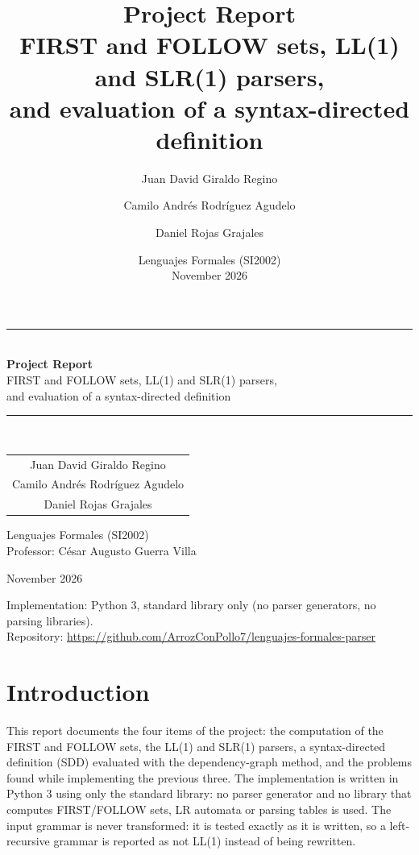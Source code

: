 \documentclass[11pt,letterpaper]{article}
\title{\vspace{-1.2cm}\textbf{\color{azul}Project Report}\\[4pt]
\large FIRST and FOLLOW sets, LL(1) and SLR(1) parsers,\\
\large and evaluation of a syntax-directed definition}
\author{Juan David Giraldo Regino \and Camilo Andrés Rodríguez Agudelo \and Daniel Rojas Grajales}
\date{Lenguajes Formales (SI2002)\\ November 2026}
\begin{document}
\begin{titlepage}
\centering
\vspace*{2.4cm}
{\color{azul}\rule{\textwidth}{1.2pt}}\\[14pt]
{\LARGE\bfseries\color{azul} Project Report}\\[10pt]
{\large FIRST and FOLLOW sets, LL(1) and SLR(1) parsers,\\[2pt]
and evaluation of a syntax-directed definition}\\[12pt]
{\color{azul}\rule{\textwidth}{1.2pt}}\\[2.2cm]

\begin{tabular}{c}
\large Juan David Giraldo Regino\\
\large Camilo Andrés Rodríguez Agudelo\\
\large Daniel Rojas Grajales
\end{tabular}

\vspace{1.5cm}
{\large Lenguajes Formales (SI2002)}\\[6pt]
{Professor: C\'esar Augusto Guerra Villa}

\vspace{1.3cm}
November 2026

\vfill
\begin{minipage}{0.86\textwidth}
\centering\small
Implementation: Python 3, standard library only (no parser generators, no parsing libraries).\\
Repository: \url{https://github.com/ArrozConPollo7/lenguajes-formales-parser}
\end{minipage}
\end{titlepage}

\tableofcontents
\newpage

\section{Introduction}

This report documents the four items of the project: the computation of the FIRST and FOLLOW
sets, the LL(1) and SLR(1) parsers, a syntax-directed definition (SDD) evaluated with the
dependency-graph method, and the problems found while implementing the previous three. The
implementation is written in Python 3 using only the standard library: no parser generator and no
library that computes FIRST/FOLLOW sets, LR automata or parsing tables is used. The input grammar
is never transformed: it is tested exactly as it is written, so a left-recursive grammar is
reported as not LL(1) instead of being rewritten.
\end{document}
